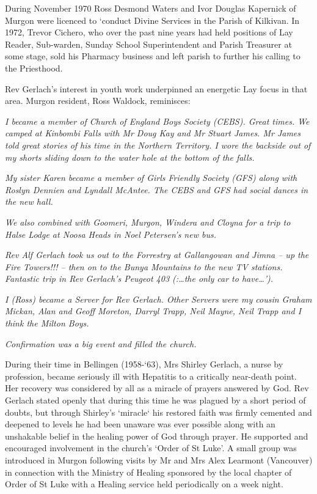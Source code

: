 During November 1970 Ross Desmond Waters and Ivor Douglas Kapernick of Murgon were licenced to `conduct Divine Services in the Parish of Kilkivan. In 1972, Trevor Cichero, who over the past nine years had held positions of Lay Reader, Sub-warden, Sunday School Superintendent and Parish Treasurer at some stage, sold his Pharmacy business and left parish to further his calling to the Priesthood.



Rev Gerlach's interest in youth work underpinned an energetic Lay focus in that area. Murgon resident, Ross Waldock, reminisces:



\emph{I became a member of Church of England Boys Society (CEBS). Great times. We camped at Kinbombi Falls with Mr Doug Kay and Mr Stuart James. Mr James told great stories of his time in the Northern Territory. I wore the backside out of my shorts sliding down to the water hole at the bottom of the falls.}



\emph{My sister Karen became a member of Girls Friendly Society (GFS) along with Roslyn Dennien and Lyndall McAntee. The CEBS and GFS had social dances in the new hall.}



\emph{We also combined with Goomeri, Murgon, Windera and Cloyna for a trip to Halse Lodge at Noosa Heads in Noel Petersen's new bus.}



\emph{Rev Alf Gerlach took us out to the Forrestry at Gallangowan and Jimna -- up the Fire Towers!!! -- then on to the Bunya Mountains to the new TV stations. Fantastic trip in Rev Gerlach's Peugeot 403 (:\ldots the only car to have\ldots').}



\emph{I (Ross) became a Server for Rev Gerlach. Other Servers were my cousin Graham Mickan, Alan and Geoff Moreton, Darryl Trapp, Neil Mayne, Neil Trapp and I think the Milton Boys.}



\emph{Confirmation was a big event and filled the church.}



During their time in Bellingen (1958-`63), Mrs Shirley Gerlach, a nurse by profession, became seriously ill with Hepatitis to a critically near-death point. Her recovery was considered by all as a miracle of prayers answered by God. Rev Gerlach stated openly that during this time he was plagued by a short period of doubts, but through Shirley's `miracle` his restored faith was firmly cemented and deepened to levels he had been unaware was ever possible along with an unshakable belief in the healing power of God through prayer. He supported and encouraged involvement in the church's `Order of St Luke'. A small group was introduced in Murgon following visits by Mr and Mrs Alex Learmont (Vancouver) in connection with the Ministry of Healing sponsored by the local chapter of Order of St Luke with a Healing service held periodically on a week night.



